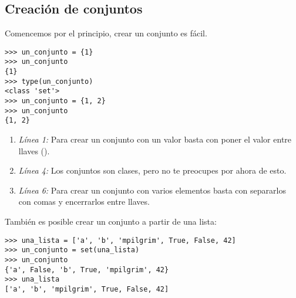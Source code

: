 \subsection{Creación de conjuntos}

Comencemos por el principio, crear un conjunto es fácil.

\noindent\begin{minipage}{\textwidth}
\begin{lstlisting}[mathescape=True]
>>> un_conjunto = {1}
>>> un_conjunto
{1}
>>> type(un_conjunto)
<class 'set'>
>>> un_conjunto = {1, 2}
>>> un_conjunto
{1, 2}
\end{lstlisting}
\end{minipage}

\begin{enumerate}

\item \emph{Línea 1:} Para crear un conjunto con un valor basta con poner el valor entre llaves (\codigo{{}}).

\item \emph{Línea 4:} Los conjuntos son clases, pero no te preocupes por ahora de esto.

\item \emph{Línea 6:} Para crear un conjunto con varios elementos basta con separarlos con comas y encerrarlos entre llaves.

\end{enumerate}

También es posible crear un conjunto a partir de una lista:

\noindent\begin{minipage}{\textwidth}
\begin{lstlisting}[mathescape=True]
>>> una_lista = ['a', 'b', 'mpilgrim', True, False, 42]
>>> un_conjunto = set(una_lista)
>>> un_conjunto
{'a', False, 'b', True, 'mpilgrim', 42}
>>> una_lista 
['a', 'b', 'mpilgrim', True, False, 42]
\end{lstlisting}
\end{minipage}

